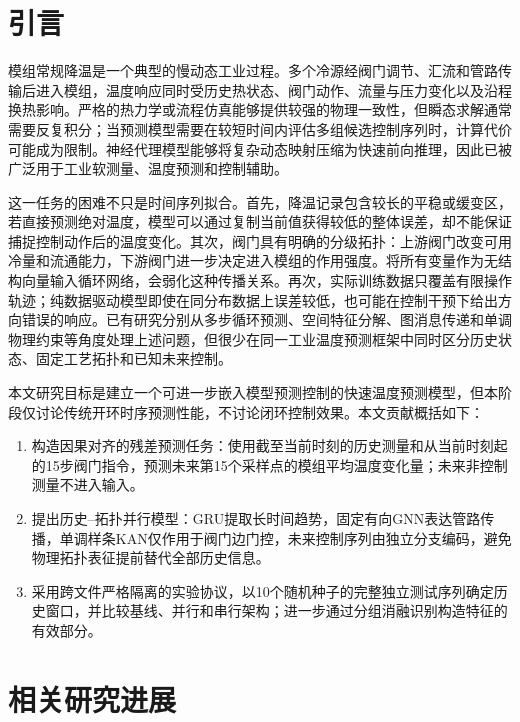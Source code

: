 \documentclass[a4paper,fleqn]{cas-dc}
\begin{document}
\maketitle

\section{引言}\label{sec:introduction}

模组常规降温是一个典型的慢动态工业过程。多个冷源经阀门调节、汇流和管路传输后进入模组，温度响应同时受历史热状态、阀门动作、流量与压力变化以及沿程换热影响。严格的热力学或流程仿真能够提供较强的物理一致性，但瞬态求解通常需要反复积分；当预测模型需要在较短时间内评估多组候选控制序列时，计算代价可能成为限制。神经代理模型能够将复杂动态映射压缩为快速前向推理，因此已被广泛用于工业软测量、温度预测和控制辅助\citep{faridi2023spatiotemporal,tan2022multistep,costa2024multistep}。

这一任务的困难不只是时间序列拟合。首先，降温记录包含较长的平稳或缓变区，若直接预测绝对温度，模型可以通过复制当前值获得较低的整体误差，却不能保证捕捉控制动作后的温度变化。其次，阀门具有明确的分级拓扑：上游阀门改变可用冷量和流通能力，下游阀门进一步决定进入模组的作用强度。将所有变量作为无结构向量输入循环网络，会弱化这种传播关系。再次，实际训练数据只覆盖有限操作轨迹；纯数据驱动模型即使在同分布数据上误差较低，也可能在控制干预下给出方向错误的响应。已有研究分别从多步循环预测、空间特征分解、图消息传递和单调物理约束等角度处理上述问题，但很少在同一工业温度预测框架中同时区分历史状态、固定工艺拓扑和已知未来控制。

本文研究目标是建立一个可进一步嵌入模型预测控制的快速温度预测模型，但本阶段仅讨论传统开环时序预测性能，不讨论闭环控制效果。本文贡献概括如下：
\begin{enumerate}
  \item 构造因果对齐的残差预测任务：使用截至当前时刻的历史测量和从当前时刻起的15步阀门指令，预测未来第15个采样点的模组平均温度变化量；未来非控制测量不进入输入。
  \item 提出历史--拓扑并行模型：GRU提取长时间趋势，固定有向GNN表达管路传播，单调样条KAN仅作用于阀门边门控，未来控制序列由独立分支编码，避免物理拓扑表征提前替代全部历史信息。
  \item 采用跨文件严格隔离的实验协议，以10个随机种子的完整独立测试序列确定历史窗口，并比较基线、并行和串行架构；进一步通过分组消融识别构造特征的有效部分。
\end{enumerate}

\section{相关研究进展}\label{sec:related}
\end{document}
